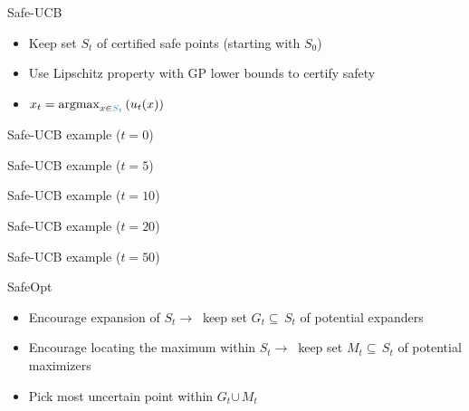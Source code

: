 \documentclass[xetex,10pt,mathserif]{beamer}
\newlength\figureheight
\newlength\figurewidth
\newcommand{\localucb}{{\sc\textsf{Safe-UCB}}\xspace}
\newcommand{\cst}{{\color{cyan!70!black}$S_t$}\xspace}
\newcommand{\ccst}{{\color{cyan!70!black}S_t}\xspace}
\newcommand{\cgt}{{\color{lime!70!black}$G_t$}\xspace}
\newcommand{\cmt}{{\color{orange!70!black}$M_t$}\xspace}
\begin{document}
\begin{frame}{\localucb}
\begin{itemize}
  \item<1-> Keep set \cst of certified safe points (starting with $S_0$)
  \vspace{2em}
  \item<2-> Use Lipschitz property with GP lower bounds to certify safety
  \vspace{2em}
  \item<3-> $x_t = \argmax_{x \in \ccst} \left( u_t(x) \right)$
\end{itemize}
\end{frame}

\begin{frame}{\localucb example ($t = 0$)}
\centering
\setlength\figurewidth{5in}
\setlength\figureheight{3.5in}

\end{frame}

\begin{frame}{\localucb example ($t = 5$)}
\centering
\setlength\figurewidth{5in}
\setlength\figureheight{3.5in}

\end{frame}

\begin{frame}{\localucb example ($t = 10$)}
\centering
\setlength\figurewidth{5in}
\setlength\figureheight{3.5in}

\end{frame}

\begin{frame}{\localucb example ($t = 20$)}
\centering
\setlength\figurewidth{5in}
\setlength\figureheight{3.5in}

\end{frame}

\begin{frame}{\localucb example ($t = 50$)}
\centering
\setlength\figurewidth{5in}
\setlength\figureheight{3.5in}

\end{frame}

\begin{frame}{SafeOpt}
\begin{itemize}
  \item<1-> Encourage expansion of \cst $\rightarrow\ $ keep set \cgt$\subseteq\,$\cst of potential expanders
  \vspace{2em}
  \item<2-> Encourage locating the maximum within \cst $\rightarrow\ $ keep set \cmt$\subseteq\,$\cst of potential maximizers
  \vspace{2em}
  \item<3-> Pick most uncertain point within \cgt$\cup\,$\cmt
\end{itemize}
\end{frame}
\end{document}
